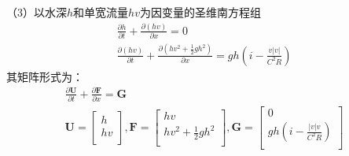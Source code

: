 （3）以水深$h$和单宽流量$hv$为因变量的圣维南方程组
\begin{equation}
  \begin{gathered}
    \frac{\partial h}{\partial t}
    +
    \frac{\partial (hv)}{\partial x}
    =
    0
    \\
    \frac{\partial (hv)}{\partial t}
    +
    \frac{\partial (hv^{2} + \frac{1}{2}gh^{2})}{\partial x}
    =
    gh
    \left(
    i-\frac{v|v|}{C^{2}R}
    \right)
  \end{gathered}
  \label{EqCGe_SV_hq_rect_conser}
\end{equation}
其矩阵形式为：
\begin{equation}
  \begin{gathered}
\frac{\partial \mathbf{U}}{\partial t} +
\frac{\partial \mathbf{F}}{\partial x} =
\mathbf{G}
\\
  \mathbf{U} =
  \begin{bmatrix}
    h \\
    hv \\
  \end{bmatrix}
  ,
  \mathbf{F} =
  \begin{bmatrix}
    hv \\
    hv^{2}+\frac{1}{2}gh^{2} \\
  \end{bmatrix}
  ,
  \mathbf{G} =
  \begin{bmatrix}
    0 \\
    gh(i - \frac{|v|v}{C^{2}R}) \\
  \end{bmatrix}
\end{gathered}
  \label{EqCGe_SV_hq_rect_conser_matrix}
\end{equation}

